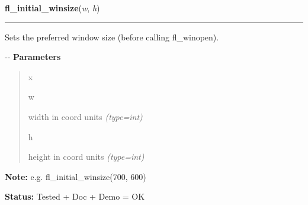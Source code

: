 \hspace{.8\funcindent}\begin{boxedminipage}{\funcwidth}

    \raggedright \textbf{fl\_initial\_winsize}(\textit{w}, \textit{h})

    \vspace{-1.5ex}

    \rule{\textwidth}{0.5\fboxrule}
\setlength{\parskip}{2ex}

Sets the preferred window size (before calling fl\_winopen).

-{}-
\setlength{\parskip}{1ex}
      \textbf{Parameters}
      \vspace{-1ex}

      \begin{quote}
        \begin{Ventry}{x}

          \item[w]


width in coord units
            {\it (type=int)}

          \item[h]


height in coord units
            {\it (type=int)}

        \end{Ventry}

      \end{quote}

\textbf{Note:} 
e.g. fl\_initial\_winsize(700, 600)


\textbf{Status:} 
Tested + Doc + Demo = OK


    \end{boxedminipage}

    \label{xformslib:flxbasic:fl_initial_winstate}

    \vspace{0.5ex}

